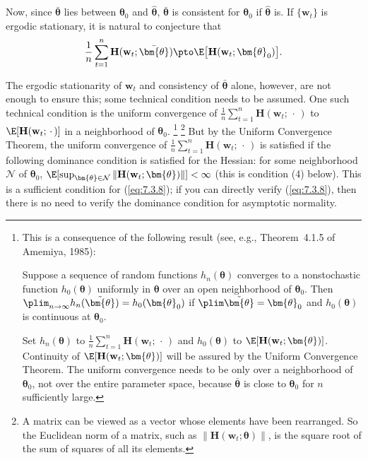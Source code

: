 Now, since $\bar{\bm{\theta}}$ lies between $\bm{\theta}_0$ and $\hat{\bm{\theta}}$, $\bar{\bm{\theta}}$ is consistent for $\bm{\theta}_0$ if $\hat{\bm{\theta}}$ is. If $\{\mathbf{w}_t\}$ is ergodic stationary, it is natural to conjecture that
\begin{equation}
\label{eq:7.3.8}
\frac{1}{n} \sum_{t=1}^{n} \mathbf{H}(\mathbf{w}_t; \bar{\bm{\theta}}) \pto \E\bigl[\mathbf{H}(\mathbf{w}_t; \bm{\theta}_0)\bigr].
\end{equation}

The ergodic stationarity of $\mathbf{w}_t$ and consistency of $\bar{\bm{\theta}}$ alone, however, are not enough to ensure this; some technical condition needs to be assumed. One such technical condition is the uniform convergence of $\frac{1}{n}\sum_{t=1}^{n}\mathbf{H}(\mathbf{w}_t; \,\cdot\,)$ to $\E[\mathbf{H}(\mathbf{w}_t; \,\cdot\,)]$ in a neighborhood of $\bm{\theta}_0$.%
\footnote{This is a consequence of the following result (see, e.g., Theorem~4.1.5 of Amemiya, 1985):

Suppose a sequence of random functions $h_n(\bm{\theta})$ converges to a nonstochastic function $h_0(\bm{\theta})$ uniformly in $\bm{\theta}$ over an open neighborhood of $\bm{\theta}_0$. Then $\plim_{n\to\infty} h_n(\tilde{\bm{\theta}}) = h_0(\bm{\theta}_0)$ if $\plim \tilde{\bm{\theta}} = \bm{\theta}_0$ and $h_0(\bm{\theta})$ is continuous at $\bm{\theta}_0$.

Set $h_n(\bm{\theta})$ to $\frac{1}{n}\sum_{t=1}^{n}\mathbf{H}(\mathbf{w}_t; \,\cdot\,)$ and $h_0(\bm{\theta})$ to $\E[\mathbf{H}(\mathbf{w}_t; \bm{\theta})]$. Continuity of $\E[\mathbf{H}(\mathbf{w}_t; \bm{\theta})]$ will be assured by the Uniform Convergence Theorem. The uniform convergence needs to be only over a neighborhood of $\bm{\theta}_0$, not over the entire parameter space, because $\bar{\bm{\theta}}$ is close to $\bm{\theta}_0$ for $n$ sufficiently large.}%
\footnote{A matrix can be viewed as a vector whose elements have been rearranged. So the Euclidean norm of a matrix, such as $\|\mathbf{H}(\mathbf{w}_t; \bm{\theta})\|$, is the square root of the sum of squares of all its elements.}
But by the Uniform Convergence Theorem, the uniform convergence of $\frac{1}{n}\sum_{t=1}^{n}\mathbf{H}(\mathbf{w}_t; \,\cdot\,)$ is satisfied if the following dominance condition is satisfied for the Hessian: for some neighborhood $\mathcal{N}$ of $\bm{\theta}_0$, $\E[\sup_{\bm{\theta} \in \mathcal{N}} \|\mathbf{H}(\mathbf{w}_t; \bm{\theta})\|] < \infty$ (this is condition (4) below). This is a sufficient condition for (\ref{eq:7.3.8}); if you can directly verify (\ref{eq:7.3.8}), then there is no need to verify the dominance condition for asymptotic normality.

